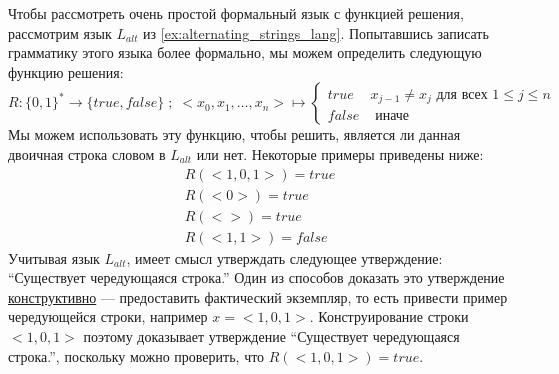 \begin{example} Чтобы рассмотреть очень простой формальный язык с функцией решения, рассмотрим язык $L_{alt}$ из \examplename{} \ref{ex:alternating_strings_lang}. Попытавшись записать грамматику этого языка более формально, мы можем определить следующую функцию решения:
$$
R: \{0,1\}^* \to \{true,false\}\;;\; <x_0,x_1,\ldots,x_n> \mapsto 
\begin{cases}
true & x_{j-1} \neq x_{j} \text{ для всех } 1\leq j \leq n \\
false & \text{ иначе}
\end{cases}
$$
Мы можем использовать эту функцию, чтобы решить, является ли данная двоичная строка словом в $L_{alt}$ или нет. Некоторые примеры приведены ниже:
$$
\begin{array}{l}
R(<1,0,1>)=true\\ 
R(<0>)=true\\
R(<>)=true\\ 
R(<1,1>)=false
\end{array} 
$$
Учитывая язык $L_{alt}$, имеет смысл утверждать следующее утверждение: ``Существует чередующаяся строка.'' Один из способов доказать это утверждение \href{https://en.wikipedia.org/wiki/Constructive_proof}{конструктивно} — предоставить фактический экземпляр, то есть привести пример чередующейся строки, например $x = <1,0,1>$. Конструирование строки $<1,0,1>$ поэтому доказывает утверждение ``Существует чередующаяся строка.'', поскольку можно проверить, что $R(<1,0,1>)=true$.
\end{example}
